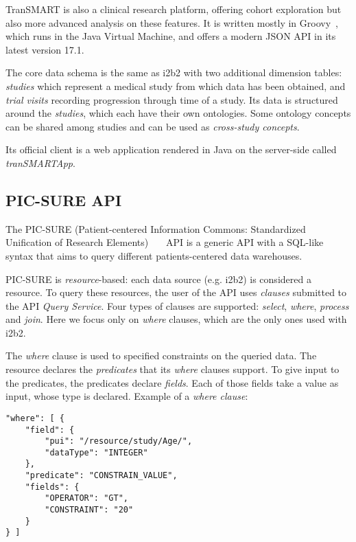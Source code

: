 TranSMART is also a clinical research platform, offering cohort exploration but also more advanced analysis on these features.
It is written mostly in Groovy~\cite{groovy}, which runs in the Java Virtual Machine, and offers a modern JSON API in its latest version 17.1.

The core data schema is the same as i2b2 with two additional dimension tables: \emph{studies} which represent a medical study from which data has been obtained, and \emph{trial visits} recording progression through time of a study.
Its data is structured around the \emph{studies}, which each have their own ontologies.
Some ontology concepts can be shared among studies and can be used as \emph{cross-study concepts}.

Its official client is a web application rendered in Java on the server-side called \emph{tranSMARTApp}.


\subsection{PIC-SURE API}
\label{sec:bg-picsure}

The PIC-SURE (Patient-centered Information Commons: Standardized Unification of Research Elements)~\cite{bd2k}~\cite{PIC-SURE}~\cite{PIC-SURE-API} API is a generic API with a SQL-like syntax that aims to query different patients-centered data warehouses.

PIC-SURE is \emph{resource}-based: each data source (e.g. i2b2) is considered a resource.
To query these resources, the user of the API uses \emph{clauses} submitted to the API \emph{Query Service}.
Four types of clauses are supported: \emph{select}, \emph{where}, \emph{process} and \emph{join}.
Here we focus only on \emph{where} clauses, which are the only ones used with i2b2.

The \emph{where} clause is used to specified constraints on the queried data.
The resource declares the \emph{predicates} that its \emph{where} clauses support.
To give input to the predicates, the predicates declare \emph{fields}.
Each of those fields take a value as input, whose type is declared.
Example of a \emph{where clause}:
\begin{verbatim}
"where": [ {
    "field": {
        "pui": "/resource/study/Age/",
        "dataType": "INTEGER"
    },
    "predicate": "CONSTRAIN_VALUE",
    "fields": {
        "OPERATOR": "GT",
        "CONSTRAINT": "20"
    }
} ]
\end{verbatim}

